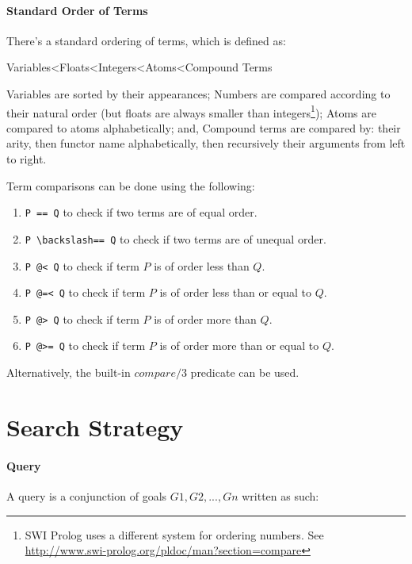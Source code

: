 \documentclass{article}
\begin{document}
\begin{multicols}{2}
  \paragraph{Standard Order of Terms} There's a standard ordering of terms, which is defined as:
  
  \noindent \small Variables\textless Floats\textless Integers\textless Atoms\textless Compound Terms
  
  Variables are sorted by their appearances; Numbers are compared according to their natural order (but floats are always smaller than integers\footnote{SWI Prolog uses a different system for ordering numbers. See \href{http://www.swi-prolog.org/pldoc/man?section=compare}{http://www.swi-prolog.org/pldoc/man?section=compare}}); Atoms are compared to atoms alphabetically; and, Compound terms are compared by: their arity, then functor name alphabetically, then recursively their arguments from left to right. 
  
  Term comparisons can be done using the following:
  
  \begin{enumerate}
  \item \lstinline{P == Q} to check if two terms are of equal order.
  \item \lstinline{P \backslash== Q} to check if two terms are of unequal order.
  \item \lstinline{P @< Q} to check if term $P$ is of order less than $Q$.
  \item \lstinline{P @=< Q} to check if term $P$ is of order less than or equal to $Q$.
  \item \lstinline{P @> Q} to check if term $P$ is of order more than $Q$.
  \item \lstinline{P @>= Q} to check if term $P$ is of order more than or equal to $Q$.
  \end{enumerate}
  
  Alternatively, the built-in $compare/3$ predicate can be used.
  
  \section{Search Strategy}
  
  \paragraph{Query} A query is a conjunction of goals $G1, G2, ..., Gn$ written as such:
  

\end{multicols}
\end{document}
